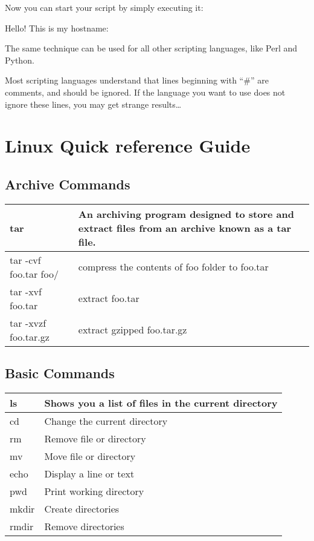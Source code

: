 Now you can start your script by simply executing it:

\begin{prompt}
Hello! This is my hostname:
\end{prompt}

The same technique can be used for all other scripting languages, like Perl and Python.

Most scripting languages understand that lines beginning with ``\#'' are
comments, and should be ignored. If the language you want to use does not
ignore these lines, you may get strange results\ldots

\section{Linux Quick reference Guide}

\subsection{Archive Commands}

\begin{tabular}{|p{}|p{}|} \hline
tar                   & An archiving program designed to store and extract files from an archive known as a tar file.  \\ \hline
tar -cvf foo.tar foo/ & compress the contents of foo folder to foo.tar \\ \hline
tar -xvf foo.tar      & extract foo.tar \\ \hline
tar -xvzf foo.tar.gz  & extract gzipped foo.tar.gz \\ \hline
\end{tabular}


\subsection{Basic Commands}

\begin{tabular}{|p{}|p{}|} \hline
ls     & Shows you a list of files in the current directory \\ \hline
cd     & Change the current directory \\ \hline
rm     & Remove file or directory \\ \hline
mv     & Move file or directory \\ \hline
echo   & Display a line or text \\ \hline
pwd    & Print working directory \\ \hline
mkdir  & Create directories \\ \hline
rmdir  & Remove directories \\ \hline
\end{tabular}


